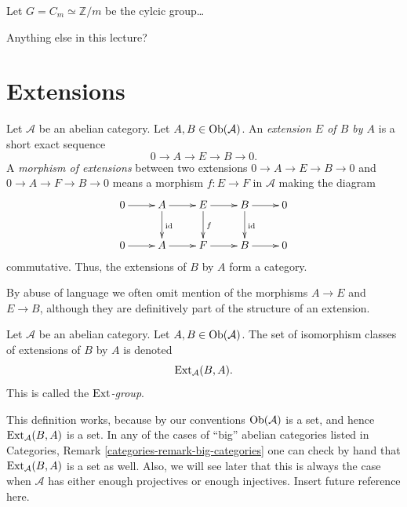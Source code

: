 \begin{example}
\label{example-group-cohom-cyclic}
Let $G = C_m \simeq \mathbb{Z}/m$
be the cylcic group…
\end{example}


\noindent
Anything else in this lecture?


\section{Extensions}
\label{section-extensions}

\begin{definition}
\label{definition-extension}
Let $\mathcal{A}$ be an abelian category.
Let $A, B \in \mathop{\mathrm{Ob}}\nolimits(\mathcal{A})$.
An {\it extension $E$ of $B$ by $A$} is a
short
exact sequence
$$
0 \to A \to E \to B \to 0.
$$
A {\it morphism of extensions} between two
extensions $0 \to A \to E \to B \to 0$ and
$0 \to A \to F \to B \to 0$ means a morphism
$f : E \to F$ in $\mathcal{A}$ making the
diagram
$$
\xymatrix{
0 \ar[r] &
A \ar[r] \ar[d]^{\text{id}} &
E \ar[r] \ar[d]^f &
B \ar[r] \ar[d]^{\text{id}} &
0 \\
0 \ar[r] &
A \ar[r] &
F \ar[r] &
B \ar[r] &
0
}
$$
commutative.
Thus, the extensions of $B$ by $A$ form a
category.
\end{definition}

\noindent
By abuse of language we often omit mention of
the
morphisms $A \to E$ and $E \to B$, although
they are
definitively part of the structure of an
extension.

\begin{definition}
\label{definition-ext-group}
Let $\mathcal{A}$ be an abelian category.
Let $A, B \in \mathop{\mathrm{Ob}}\nolimits(\mathcal{A})$.
The set of isomorphism classes of extensions
of $B$ by $A$ is denoted
$$
\mathop{\mathrm{Ext}}\nolimits_\mathcal{A}(B, A).
$$
This is called the {\it $\mathop{\mathrm{Ext}}\nolimits$-group}.
\end{definition}

\noindent
This definition works, because by our
conventions
$\mathop{\mathrm{Ob}}\nolimits(\mathcal{A})$ is a set, and hence
$\mathop{\mathrm{Ext}}\nolimits_\mathcal{A}(B, A)$ is a set.
In any of the cases of ``big'' abelian
categories
listed in Categories, Remark
\ref{categories-remark-big-categories}
one can check by hand that
$\mathop{\mathrm{Ext}}\nolimits_\mathcal{A}(B, A)$
is a set as well. Also, we will see later
that this is
always the case when $\mathcal{A}$ has either
enough projectives
or enough injectives. Insert future reference
here.

